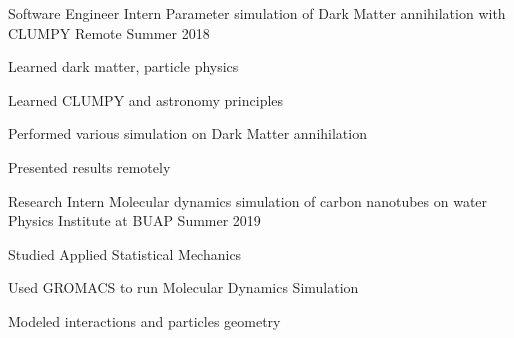 \begin{cventries}
  \cventry
    {Software Engineer Intern} %
    {Parameter simulation of Dark Matter annihilation with CLUMPY} %
    {Remote} %
    {Summer 2018} %
    {
      \begin{cvitems} %
        \item Learned dark matter, particle physics
		\item Learned CLUMPY and astronomy principles
		\item Performed various simulation on Dark Matter annihilation
		\item Presented results remotely
      \end{cvitems}
    }

  \cventry
    {Research Intern} %
    {Molecular dynamics simulation of carbon nanotubes on water} %
    {Physics Institute at BUAP} %
    {Summer 2019} %
    {
      \begin{cvitems} %
        \item Studied Applied Statistical Mechanics
		\item Used GROMACS to run Molecular Dynamics Simulation
		\item Modeled interactions and particles geometry
      \end{cvitems}
    }

\end{cventries}
